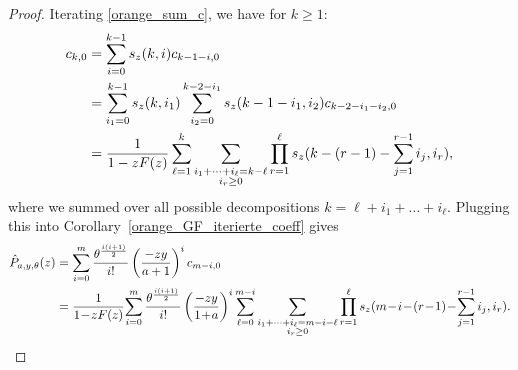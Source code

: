 \documentclass[12pt]{article}
\newcommand{\1}{\mathds{1}}
\theoremstyle{definition}
\theoremstyle{plain}
\theoremstyle{remark}
\begin{document}
    \begin{proof} Iterating \eqref{orange_sum_c}, we have for $k\ge 1$:
    \begin{align}
        c_{k,0}&=\sum_{i=0}^{k-1}s_z(k,i)c_{k-1-i,0}\notag
        \\&=\sum_{i_1=0}^{k-1}s_z(k,i_1)\sum_{i_2=0}^{k-2-i_1}s_z(k-1-i_1,i_2)c_{k-2-i_1-i_2,0}\notag
           \\&=\frac{1}{1-zF(z)}\sum_{{\ell}=1}^k\sum_{\substack{i_1+\dots +i_{\ell}= k-{\ell}\\i_r\ge 0}}\prod_{r=1}^{\ell}s_z(k-(r-1)-\sum_{j=1}^{r-1}i_j,i_r),\notag
    \end{align}
    where we summed over all possible decompositions $k=\ell+i_1+\dots+i_\ell$.
    Plugging this into Corollary~\ref{orange_GF_iterierte_coeff} gives
    \begin{align*}
       \hat{P}_{a,y,\theta}(z)
       &= \sum_{i=0}^m\frac{\theta^\frac{i(i+1)}{2}}{i!}\left(\frac{-zy}{a+1}\right)^ic_{m-i,0}
       \\&=\frac{1}{1\!-\!zF(z)}\!\sum_{i=0}^{m}\frac{\theta^\frac{i(i+1)}{2}}{i!}\left(\frac{-zy}{1\!+\!a}\right)^i\sum_{{\ell}=0}^{m-i}\sum_{\substack{i_1+\dots +i_{\ell}= m-i-{\ell}\\i_r\ge 0}}\prod_{r=1}^{\ell}s_z(m\!-\!i\!-\!(r\!-\!1)\!-\!\sum_{j=1}^{r-1}i_j,i_r). \qedhere
    \end{align*}
    \end{proof}
\end{document}
